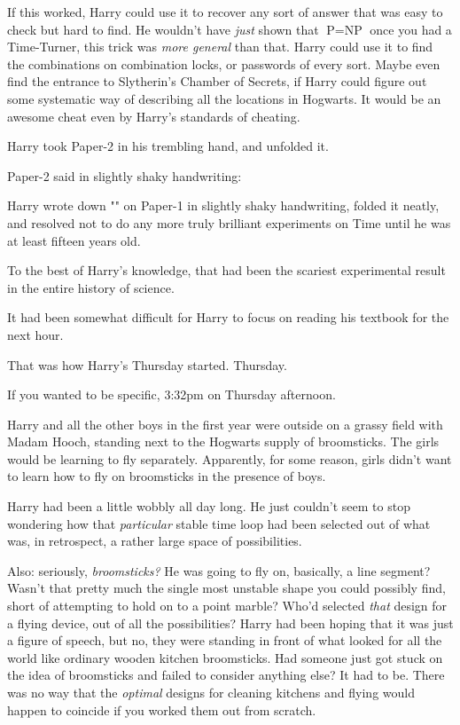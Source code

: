 If this worked, Harry could use it to recover any sort of answer that was easy
to check but hard to find. He wouldn’t have \emph{just} shown that $\mbox{P}=\mbox{NP}$ once
you had a Time-Turner, this trick was \emph{more general} than that. Harry
could use it to find the combinations on combination locks, or passwords of
every sort. Maybe even find the entrance to Slytherin’s Chamber of Secrets, if
Harry could figure out some systematic way of describing all the locations in
Hogwarts. It would be an awesome cheat even by Harry’s standards of cheating.

Harry took Paper-2 in his trembling hand, and unfolded it.

Paper-2 said in slightly shaky handwriting:


Harry wrote down "" on Paper-1 in slightly shaky
handwriting, folded it neatly, and resolved not to do any more truly brilliant
experiments on Time until he was at least fifteen years old.

To the best of Harry’s knowledge, that had been the scariest experimental
result in the entire history of science.

It had been somewhat difficult for Harry to focus on reading his textbook for
the next hour.

That was how Harry’s Thursday started.
\later
Thursday.

If you wanted to be specific, 3:32pm on Thursday afternoon.

Harry and all the other boys in the first year were outside on a grassy field
with Madam Hooch, standing next to the Hogwarts supply of broomsticks. The
girls would be learning to fly separately. Apparently, for some reason, girls
didn’t want to learn how to fly on broomsticks in the presence of boys.

Harry had been a little wobbly all day long. He just couldn’t seem to stop
wondering how that \emph{particular} stable time loop had been selected out of
what was, in retrospect, a rather large space of possibilities.

Also: seriously, \emph{broomsticks?} He was going to fly on, basically, a line
segment? Wasn’t that pretty much the single most unstable shape you could
possibly find, short of attempting to hold on to a point marble? Who’d selected
\emph{that} design for a flying device, out of all the possibilities? Harry had
been hoping that it was just a figure of speech, but no, they were standing in
front of what looked for all the world like ordinary wooden kitchen
broomsticks. Had someone just got stuck on the idea of broomsticks and
failed to consider anything else? It had to be. There was no way that the
\emph{optimal} designs for cleaning kitchens and flying would happen to
coincide if you worked them out from scratch.

